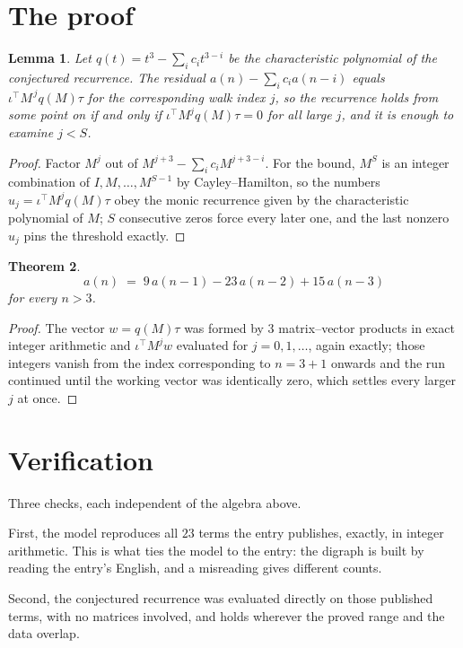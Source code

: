 \documentclass[11pt,a4paper]{article}
\theoremstyle{plain}
\newtheorem{theorem}{Theorem}
\newtheorem{lemma}[theorem]{Lemma}
\theoremstyle{definition}
\begin{document}
\section{The proof}

\begin{lemma}\label{lem:crit}
Let $q(t)=t^{3}-\sum_i c_it^{3-i}$ be the characteristic polynomial of the
conjectured recurrence. The residual $a(n)-\sum_ic_ia(n-i)$ equals
$\iota^{\!\top}M^{\,j}q(M)\tau$ for the corresponding walk index $j$, so the recurrence
holds from some point on if and only if $\iota^{\!\top}M^{j}q(M)\tau=0$ for all large $j$,
and it is enough to examine $j<S$.
\end{lemma}

\begin{proof}
Factor $M^{j}$ out of $M^{j+3}-\sum_ic_iM^{j+3-i}$. For the bound, $M^{S}$
is an integer combination of $I,M,\dots,M^{S-1}$ by Cayley--Hamilton, so the numbers
$u_j=\iota^{\!\top}M^{j}q(M)\tau$ obey the monic recurrence given by the characteristic
polynomial of $M$; $S$ consecutive zeros force every later one, and the last nonzero $u_j$
pins the threshold exactly.
\end{proof}

\begin{theorem}
\[
a(n)\;=\;9\,a(n-1) - 23\,a(n-2) + 15\,a(n-3)
\]
for every $n>3$.
\end{theorem}

\begin{proof}
The vector $w=q(M)\tau$ was formed by $3$ matrix--vector products in exact integer
arithmetic and $\iota^{\!\top}M^{j}w$ evaluated for $j=0,1,\dots$, again exactly; those
integers vanish from the index corresponding to $n=3+1$ onwards and the run continued
until the working vector was identically zero, which settles every larger $j$ at once.
\end{proof}

\section{Verification}

Three checks, each independent of the algebra above.

First, the model reproduces all $23$ terms the entry publishes, exactly, in integer
arithmetic. This is what ties the model to the entry: the digraph is built by reading the
entry's English, and a misreading gives different counts.

Second, the conjectured recurrence was evaluated directly on those published terms, with no
matrices involved, and holds wherever the proved range and the data overlap.
\end{document}
